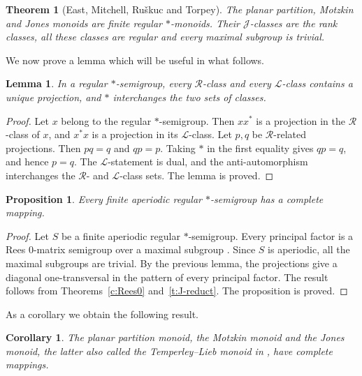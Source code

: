 \documentclass[11pt]{article}
\theoremstyle{plain}
\newtheorem{prop}[theorem]{Proposition}
\newtheorem{lemma}[theorem]{Lemma}
\newtheorem{cor}[theorem]{Corollary}
\theoremstyle{remark}
\theoremstyle{definition}
\theoremstyle{plain}
\newtheorem*{quotedtheorem}{Theorem}
\begin{document}
\begin{quotedtheorem}[East, Mitchell, Ru\v{s}kuc and Torpey]
The planar partition, Motzkin and Jones monoids are finite regular
$*$-monoids. Their $\mathcal J$-classes are the rank classes, all these
classes are regular and every maximal subgroup is trivial.
\end{quotedtheorem}

We now prove a lemma which will be useful in what follows.

\begin{lemma}\label{l:projection-matching}
In a regular $*$-semigroup, every $\mathcal R$-class and every
$\mathcal L$-class contains a unique projection, and $*$ interchanges the two
sets of classes.
\end{lemma}

\begin{proof}
Let $x$ belong to the regular $*$-semigroup. Then $xx^*$ is a projection in
the $\mathcal R$-class of $x$, and $x^*x$ is a projection in its
$\mathcal L$-class. Let $p,q$ be $\mathcal R$-related projections. Then
$pq=q$ and $qp=p$. Taking $*$ in the first equality gives $qp=q$, and hence
$p=q$. The $\mathcal L$-statement is dual, and the anti-automorphism
interchanges the $\mathcal R$- and $\mathcal L$-class sets. The lemma is
proved.
\end{proof}


\begin{prop}\label{p:aperiodic-regular-star}
Every finite aperiodic regular $*$-semigroup has a complete mapping.
\end{prop}

\begin{proof}
Let $S$ be a finite aperiodic regular $*$-semigroup. Every principal factor
is a Rees $0$-matrix semigroup over a maximal
subgroup%
. Since $S$ is
aperiodic, all the maximal subgroups are trivial. By the previous lemma, the
projections give a diagonal one-transversal in the pattern of every
principal factor. The result follows from
Theorems~\ref{c:Rees0} and~\ref{t:J-reduct}. The proposition is proved.
\end{proof}

As a corollary we obtain the following result.

\begin{cor}\label{c:planar-diagram-monoids}
{The planar partition monoid, the Motzkin monoid and the Jones
monoid, the latter also called the Temperley--Lieb monoid in
\cite[Section~2.2]{EastMitchellRuskucTorpey}, have complete mappings.}
\end{cor}
\end{document}
